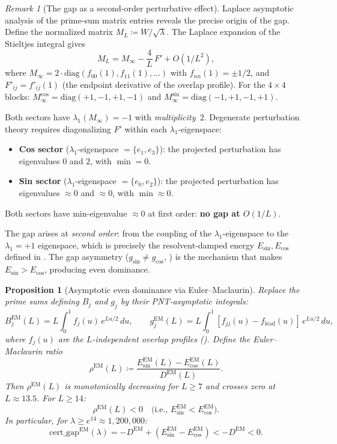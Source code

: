 \documentclass[12pt,a4paper]{article}
\newtheorem{proposition}[theorem]{Proposition}
\theoremstyle{definition}
\theoremstyle{remark}
\newtheorem{remark}[theorem]{Remark}
\begin{document}
\begin{remark}[The gap as a second-order perturbative effect]
\label{rem:gap-source}
Laplace asymptotic analysis of the prime-sum matrix entries reveals the precise origin of the gap. Define the normalized matrix $M_L \coloneqq W / \sqrt{\lambda}$. The Laplace expansion of the Stieltjes integral gives
\[
  M_L = M_\infty - \frac{4}{L}\,F' + O(1/L^2),
\]
where $M_\infty = 2 \cdot \mathrm{diag}(f_{00}(1), f_{11}(1), \ldots)$ with $f_{nn}(1) = \pm 1/2$, and $F'_{ij} = f'_{ij}(1)$ (the endpoint derivative of the overlap profile). For the $4 \times 4$ blocks: $M_\infty^{\cos} = \mathrm{diag}(+1,-1,+1,-1)$ and $M_\infty^{\sin} = \mathrm{diag}(-1,+1,-1,+1)$.

Both sectors have $\lambda_1(M_\infty) = -1$ with \emph{multiplicity~$2$}. Degenerate perturbation theory requires diagonalizing $F'$ within each $\lambda_1$-eigenspace:
\begin{itemize}
  \item \textbf{Cos sector} ($\lambda_1$-eigenspace $= \{e_1, e_3\}$): the projected perturbation has eigenvalues $0$ and $2$, with $\min = 0$.
  \item \textbf{Sin sector} ($\lambda_1$-eigenspace $= \{e_0, e_2\}$): the projected perturbation has eigenvalues $\approx 0$ and $\approx 0$, with $\min \approx 0$.
\end{itemize}
Both sectors have min-eigenvalue $\approx 0$ at first order: \textbf{no gap at $O(1/L)$}.

The gap arises at \emph{second order}: from the coupling of the $\lambda_1$-eigenspace to the $\lambda_1 = +1$ eigenspace, which is precisely the resolvent-damped energy $E_{\sin}, E_{\cos}$ defined in . The gap asymmetry ($g_{\sin} \neq g_{\cos}$, ) is the mechanism that makes $E_{\sin} > E_{\cos}$, producing even dominance.
\end{remark}

\begin{proposition}[Asymptotic even dominance via Euler--Maclaurin]
\label{prop:euler-maclaurin}
Replace the prime sums defining $B_j$ and $g_j$ by their PNT-asymptotic integrals:
\[
  B_j^{\mathrm{EM}}(L) = L\!\int_0^1 f_j(u)\,e^{Lu/2}\,du, \qquad
  g_j^{\mathrm{EM}}(L) = L\!\int_0^1 [f_{jj}(u) - f_{\mathrm{lead}}(u)]\,e^{Lu/2}\,du,
\]
where $f_j(u)$ are the $L$-independent overlap profiles (). Define the Euler--Maclaurin ratio
\[
  \rho^{\mathrm{EM}}(L) \coloneqq \frac{E_{\sin}^{\mathrm{EM}}(L) - E_{\cos}^{\mathrm{EM}}(L)}{D^{\mathrm{EM}}(L)}.
\]
Then $\rho^{\mathrm{EM}}(L)$ is monotonically decreasing for $L \geq 7$ and crosses zero at $L \approx 13.5$. For $L \geq 14$:
\[
  \rho^{\mathrm{EM}}(L) < 0 \quad\text{(i.e., } E_{\sin}^{\mathrm{EM}} < E_{\cos}^{\mathrm{EM}}\text{)}.
\]
In particular, for $\lambda \geq e^{14} \approx 1{,}200{,}000$:
\[
  \mathrm{cert\_gap}^{\mathrm{EM}}(\lambda) = -D^{\mathrm{EM}} + (E_{\sin}^{\mathrm{EM}} - E_{\cos}^{\mathrm{EM}}) < -D^{\mathrm{EM}} < 0.
\]
\end{proposition}
\end{document}
